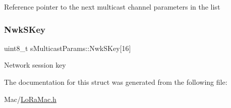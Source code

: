 Reference pointer to the next multicast channel parameters in the list \mbox{\label{structsMulticastParams_a71330fdf812a469a4727bed311a22353}} 
\subsubsection{\texorpdfstring{Nwk\+S\+Key}{NwkSKey}}
{\footnotesize\ttfamily uint8\+\_\+t s\+Multicast\+Params\+::\+Nwk\+S\+Key\mbox{[}16\mbox{]}}

Network session key 

The documentation for this struct was generated from the following file\+:\begin{DoxyCompactItemize}
\item 
Mac/\hyperlink{LoRaMac_8h}{Lo\+Ra\+Mac.\+h}\end{DoxyCompactItemize}

